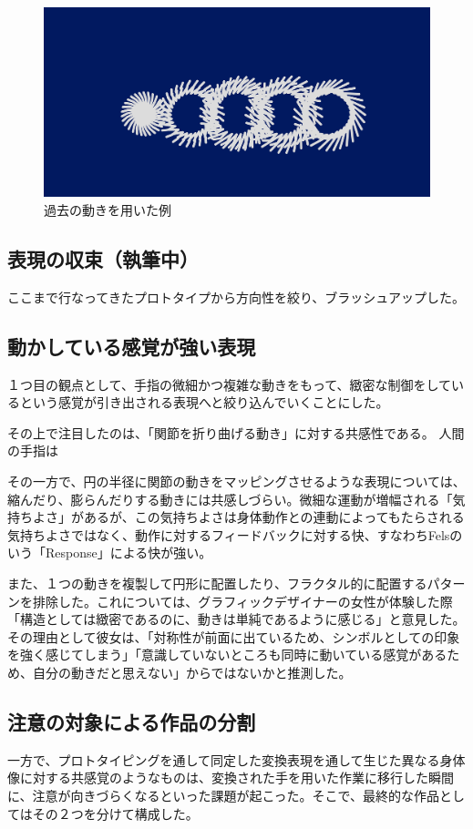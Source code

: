 \begin{figure}[H]
  \centering
  \includegraphics[width=15cm]{img/past_time.png}
  \caption{過去の動きを用いた例}
  \label{fig:prototype_delay}
\end{figure}
\subsection{表現の収束（執筆中）}
ここまで行なってきたプロトタイプから方向性を絞り、ブラッシュアップした。
\subsection*{動かしている感覚が強い表現}
１つ目の観点として、手指の微細かつ複雑な動きをもって、緻密な制御をしているという感覚が引き出される表現へと絞り込んでいくことにした。

その上で注目したのは、「関節を折り曲げる動き」に対する共感性である。
人間の手指は

その一方で、円の半径に関節の動きをマッピングさせるような表現については、縮んだり、膨らんだりする動きには共感しづらい。微細な運動が増幅される「気持ちよさ」があるが、この気持ちよさは身体動作との連動によってもたらされる気持ちよさではなく、動作に対するフィードバックに対する快、すなわちFelsのいう「Response」による快が強い。

また、１つの動きを複製して円形に配置したり、フラクタル的に配置するパターンを排除した。これについては、グラフィックデザイナーの女性が体験した際「構造としては緻密であるのに、動きは単純であるように感じる」と意見した。その理由として彼女は、「対称性が前面に出ているため、シンボルとしての印象を強く感じてしまう」「意識していないところも同時に動いている感覚があるため、自分の動きだと思えない」からではないかと推測した。

\subsection*{注意の対象による作品の分割}
一方で、プロトタイピングを通して同定した変換表現を通して生じた異なる身体像に対する共感覚のようなものは、変換された手を用いた作業に移行した瞬間に、注意が向きづらくなるといった課題が起こった。そこで、最終的な作品としてはその２つを分けて構成した。

